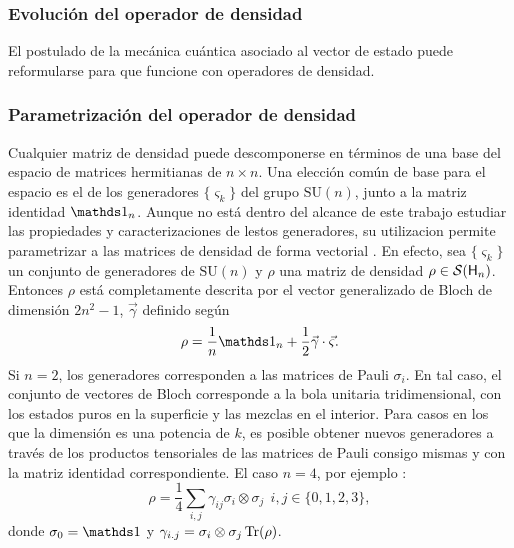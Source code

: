 \subsubsection{Evolución del operador de densidad}
El postulado de la mecánica cuántica asociado al vector de estado puede reformularse para que funcione con operadores de densidad.

\subsubsection{Parametrización del operador de densidad}
Cualquier matriz de densidad puede descomponerse en términos de una base del espacio de matrices hermitianas de $n\times n$. Una elección común de base para el espacio es el de los generadores $\{\varsigma_{k}\}$ del grupo $\text{SU}(n)$, junto a la matriz identidad $\Id_{n}$. Aunque no está dentro del alcance de este trabajo estudiar las propiedades y caracterizaciones de lestos generadores, su utilizacion permite parametrizar a las matrices de densidad de forma vectorial \cite{Bruning}. En efecto, sea $\{\varsigma_{k}\}$ un conjunto de generadores de $\text{SU}(n)$ y $\rho$ una matriz de densidad $\rho\in\mathcal{S}({\sf H}_{n})$. Entonces $\rho$ está completamente descrita por el vector generalizado de Bloch de dimensión $2n^{2}-1$, $\vec{\gamma}$ definido según
\begin{equation}
    \rho=\frac{1}{n}\Id_{n}+\frac{1}{2}\vec{\gamma}\cdot\vec{\varsigma}.
\end{equation}
Si $n=2$, los generadores corresponden a las matrices de Pauli $\sigma_{i}$. En tal caso, el conjunto de vectores de Bloch corresponde a la bola unitaria tridimensional, con los estados puros en la superficie y las mezclas en el interior. Para casos en los que la dimensión es una potencia de $k$, es posible obtener nuevos generadores a través de los productos tensoriales de las matrices de Pauli consigo mismas y con la matriz identidad correspondiente. El caso $n=4$, por ejemplo \cite{Chuang}:
\begin{equation}
    \rho=\frac{1}{4}\sum_{i,j}\gamma_{ij}\sigma_{i}\otimes \sigma_{j} \ \ i,j\in\{0,1,2,3\},
\end{equation}
donde $\sigma_{0}=\Id$ y $\gamma_{i.j}=\sigma_{i}\otimes \sigma_{j}\Tr(\rho)$.